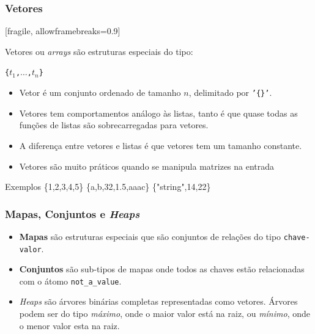 
\begin{frame}
	\frametitle{Vetores} [fragile, allowframebreaks=0.9]
	
	Vetores ou \textit{arrays} são estruturas especiais do tipo:
	\begin{center}
		 \texttt{\{$t_1$,$\ldots$,$t_{n}$\}}
		\end{center}
	
	\begin{itemize}
	 \pause
	   \item Vetor é um conjunto ordenado de tamanho $n$, delimitado por \texttt{'\{\}'}.
	   \item 	Vetores tem comportamentos análogo às listas, tanto é que quase todas as funções de listas
	são sobrecarregadas para vetores. 
	
		   \item A diferença entre vetores e listas é que vetores tem um tamanho  constante.
		   \item Vetores são muito práticos quando se manipula matrizes na entrada
		   
	 \end{itemize} 

	
	\begin{exampleblock}{Exemplos}
		\{1,2,3,4,5\} \: \{a,b,32,1.5,aaac\} \: \{"string",14,22\}
	\end{exampleblock}
	
\end{frame}


\begin{frame}
	\frametitle{Mapas, Conjuntos e \textit{Heaps}}
	
	\begin{itemize}
		\item \textbf{Mapas} são estruturas especiais que são conjuntos de relações do tipo \texttt{chave-valor}.
		
		\item \textbf{Conjuntos} são sub-tipos de mapas onde todos as chaves estão relacionadas com o átomo 
		\texttt{not\_a\_value}.
		
		\item \textit{Heaps} são árvores binárias completas representadas como vetores.
		Árvores podem ser do tipo \textit{máximo}, onde o maior valor está na raiz, ou \textit{mínimo}, 
		onde o menor valor esta na raiz.
	\end{itemize}
	
\end{frame}

